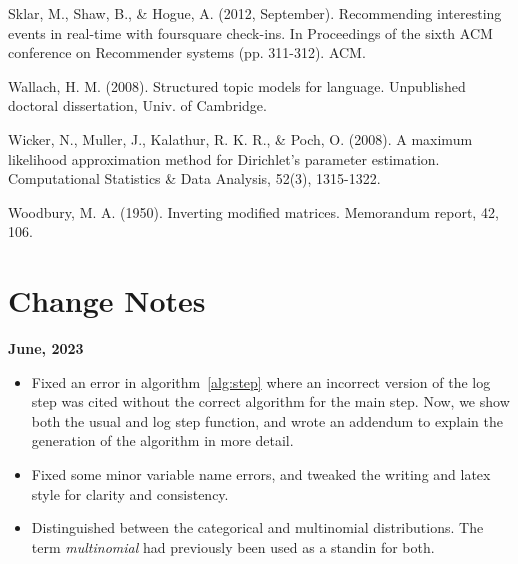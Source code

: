 \documentclass[twoside]{article}
\begin{document}
\begin{thebibliography}{20}
Sklar, M., Shaw, B., \& Hogue, A. (2012, September). Recommending interesting events in real-time with foursquare check-ins. In Proceedings of the sixth ACM conference on Recommender systems (pp. 311-312). ACM.

Wallach, H. M. (2008). Structured topic models for language. Unpublished doctoral dissertation, Univ. of Cambridge.

Wicker, N., Muller, J., Kalathur, R. K. R., \& Poch, O. (2008). A maximum likelihood approximation method for Dirichlet's parameter estimation. Computational Statistics \& Data Analysis, 52(3), 1315-1322.

Woodbury, M. A. (1950). Inverting modified matrices. Memorandum report, 42, 106.

\end{thebibliography}

\section{Change Notes}
\textbf{June, 2023}
\begin{itemize}
    \item Fixed an error in algorithm~\ref{alg:step} where an incorrect version of the log step was cited without the correct algorithm for the main step. Now, we show both the usual and log step function, and wrote an addendum\cite{addendum} to explain the generation of the algorithm in more detail.
    \item Fixed some minor variable name errors, and tweaked the writing and latex style for clarity and consistency.
    \item Distinguished between the categorical and multinomial distributions. The term \textit{multinomial} had previously been used as a standin for both.
\end{itemize}
\end{document}
